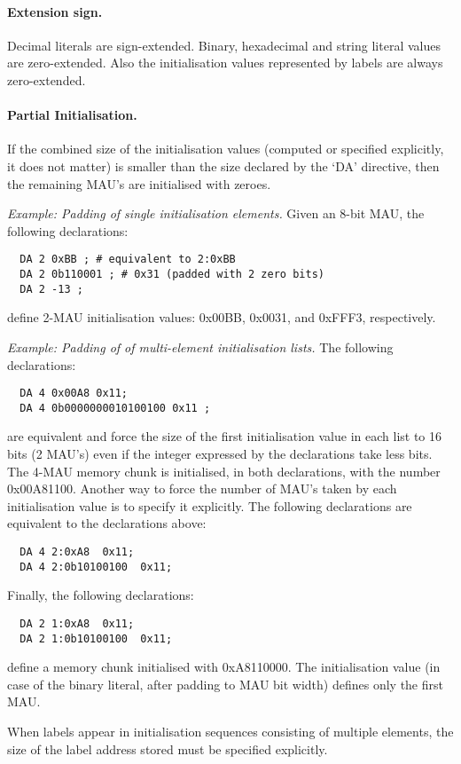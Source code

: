 \documentclass[twoside]{tceusermanual}
\begin{document}
\paragraph{Extension sign.}
Decimal literals are sign-extended. Binary, hexadecimal and string literal
values are zero-extended. Also the initialisation values represented by
labels are always zero-extended.

\paragraph{Partial Initialisation.}
If the combined size of the initialisation values (computed or specified
explicitly, it does not matter) is smaller than the size declared by the `DA'
directive, then the remaining MAU's are initialised with zeroes.

\emph{Example: Padding of single initialisation elements.}
%
Given an 8-bit MAU, the following declarations:
\begin{verbatim}
  DA 2 0xBB ; # equivalent to 2:0xBB
  DA 2 0b110001 ; # 0x31 (padded with 2 zero bits)
  DA 2 -13 ;
\end{verbatim}
define 2-MAU initialisation values: 0x00BB, 0x0031, and 0xFFF3,
respectively.

\emph{Example: Padding of of multi-element initialisation lists.}
%
The following declarations:
\begin{verbatim}
  DA 4 0x00A8 0x11;
  DA 4 0b0000000010100100 0x11 ;
\end{verbatim}
are equivalent and force the size of the first initialisation value in each
list to 16 bits (2 MAU's) even if the integer expressed by the declarations
take less bits. The 4-MAU memory chunk is initialised, in both declarations,
with the number 0x00A81100.
%
Another way to force the number of MAU's taken by each initialisation value
is to specify it explicitly.
%
The following declarations are equivalent to the declarations above:
\begin{verbatim}
  DA 4 2:0xA8  0x11;
  DA 4 2:0b10100100  0x11;
\end{verbatim}
%
Finally, the following declarations:
\begin{verbatim}
  DA 2 1:0xA8  0x11;
  DA 2 1:0b10100100  0x11;
\end{verbatim}
define a memory chunk initialised with 0xA8110000. The initialisation value
(in case of the binary literal, after padding to MAU bit width) defines
only the first MAU.

When labels appear in initialisation sequences consisting of multiple
elements, the size of the label address stored must be specified explicitly.
\end{document}
